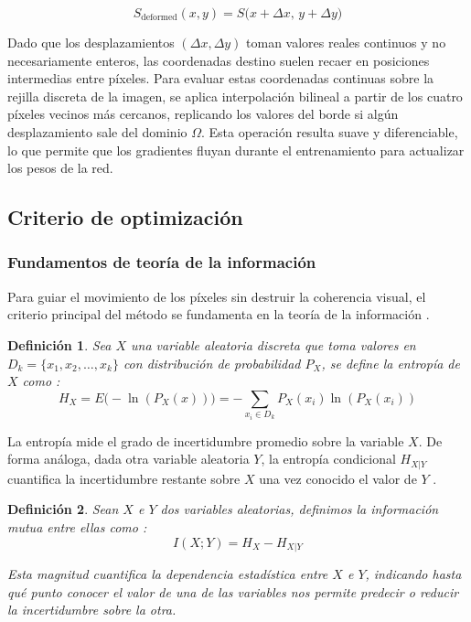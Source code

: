 \documentclass[a4paper]{article}
\newtheorem{definicion}{Definición}[section]
\begin{document}
\[
S_{\text{deformed}}(x, y) = S\big(x + \Delta x, \, y + \Delta y\big)
\]

\noindent Dado que los desplazamientos $(\Delta x, \Delta y)$ toman valores reales continuos y no necesariamente enteros, las coordenadas destino suelen recaer en posiciones intermedias entre píxeles. Para evaluar estas coordenadas continuas sobre la rejilla discreta de la imagen, se aplica interpolación bilineal a partir de los cuatro píxeles vecinos más cercanos, replicando los valores del borde si algún desplazamiento sale del dominio $\Omega$. Esta operación resulta suave y diferenciable, lo que permite que los gradientes fluyan durante el entrenamiento para actualizar los pesos de la red.

\subsection{Criterio de optimización}

\subsubsection{Fundamentos de teoría de la información}

\noindent Para guiar el movimiento de los píxeles sin destruir la coherencia visual, el criterio principal del método se fundamenta en la teoría de la información \cite{shannon1948mathematical, viola1997alignment}.

\begin{definicion}
Sea $X$ una variable aleatoria discreta que toma valores en $D_k = \{x_1, x_2, \dots, x_k\}$ con distribución de probabilidad $P_X$, se define la entropía de $X$ como \cite{shannon1948mathematical}:
\[H_X = E\big(-\ln(P_X(x))\big) = -\sum_{x_i \in D_k} P_X(x_i)\ln(P_X(x_i))\]
\end{definicion}

\noindent La entropía mide el grado de incertidumbre promedio sobre la variable $X$. De forma análoga, dada otra variable aleatoria $Y$, la entropía condicional $H_{X\vert{}Y}$ cuantifica la incertidumbre restante sobre $X$ una vez conocido el valor de $Y$ \cite{shannon1948mathematical}.

\vspace{0.3cm}

\begin{definicion}
Sean $X$ e $Y$ dos variables aleatorias, definimos la información mutua entre ellas como \cite{shannon1948mathematical, viola1997alignment}:
\[I(X; Y) = H_X - H_{X\vert{}Y}\]

\noindent Esta magnitud cuantifica la dependencia estadística entre $X$ e $Y$, indicando hasta qué punto conocer el valor de una de las variables nos permite predecir o reducir la incertidumbre sobre la otra.
\end{definicion}
\end{document}
